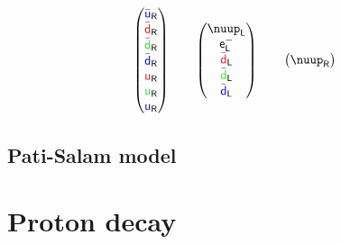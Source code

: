 \documentclass[english, fleqn]{beamer}
\begin{document}
\begin{frame}
\[\begin{pmatrix}
            \bar{\textcolor{blue} {\mathsf u}}_\mathsf R \\
            \bar{\textcolor{red}  {\mathsf d}}_\mathsf R \\
            \bar{\textcolor{green}{\mathsf d}}_\mathsf R \\
            \bar{\textcolor{blue} {\mathsf d}}_\mathsf R \\
            \textcolor{red}  {\mathsf u}_\mathsf R \\
            \textcolor{green}{\mathsf u}_\mathsf R \\
            \textcolor{blue} {\mathsf u}_\mathsf R
        \end{pmatrix}
        \qquad
        \begin{pmatrix}
            \nuup_\mathsf L \\
            \mathsf e^-_\mathsf L \\
            \bar{\textcolor{red}  {\mathsf d}}_\mathsf L \\
            \bar{\textcolor{green}{\mathsf d}}_\mathsf L \\
            \bar{\textcolor{blue} {\mathsf d}}_\mathsf L
        \end{pmatrix}
        \qquad
        \begin{pmatrix}
            \nuup_\mathsf R
        \end{pmatrix}
    \]

    \parencite{Baez/Algebra_GUT}
\end{frame}

\subsection{Pati-Salam model}

\begin{frame}
    \parencite{Wu/Proton-decay}

\end{frame}

\section{Proton decay}
\end{document}
